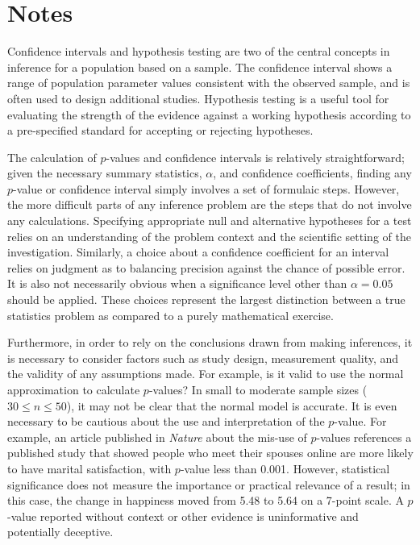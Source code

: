 \section{Notes}
\label{ch5Summary}

Confidence intervals and hypothesis testing are two of the central concepts in inference for a population based on a sample. The confidence interval shows a range of population parameter values consistent with the observed sample, and is often used to design additional studies. Hypothesis testing is a useful tool for evaluating the strength of the evidence against a working hypothesis according to a pre-specified standard for accepting or rejecting hypotheses.

The calculation of $p$-values and confidence intervals is relatively straightforward; given the necessary summary statistics, $\alpha$, and confidence coefficients, finding any $p$-value or confidence interval simply involves a set of formulaic steps. However, the more difficult parts of any inference problem are the steps that do not involve any calculations. Specifying appropriate null and alternative hypotheses for a test relies on an understanding of the problem context and the scientific setting of the investigation. Similarly, a choice about a confidence coefficient for an interval relies on judgment as to balancing precision against the chance of possible error. It is also not necessarily obvious when a significance level other than $\alpha = 0.05$ should be applied. These choices represent the largest distinction between a true statistics problem as compared to a purely mathematical exercise. 

Furthermore, in order to rely on the conclusions drawn from making inferences, it is necessary to consider factors such as study design, measurement quality, and the validity of any assumptions made. For example, is it valid to use the normal approximation to calculate $p$-values? In small to moderate sample sizes ($30 \leq n \leq 50$), it may not be clear that the normal model is accurate. It is even necessary to be cautious about the use and interpretation of the $p$-value. For example, an article published in \textit{Nature} about the mis-use of $p$-values references a published study that showed people who meet their spouses online are more likely to have marital satisfaction, with $p$-value less than 0.001. However, statistical significance does not measure the importance or practical relevance of a result; in this case, the change in happiness moved from 5.48 to 5.64 on a 7-point scale. A $p$-value reported without context or other evidence is uninformative and potentially deceptive.

